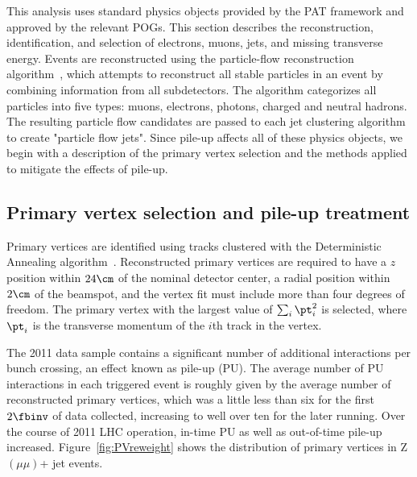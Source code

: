 This analysis uses standard physics objects provided by the PAT framework 
and approved by the relevant POGs.  This section describes the reconstruction,
identification, and selection of electrons, muons, jets, and
missing transverse energy. 
Events are reconstructed using the particle-flow reconstruction algorithm~\cite{particleflow},
which attempts to reconstruct all stable particles in an event by combining information from
all subdetectors. The algorithm categorizes all particles into five types: muons,
electrons, photons, charged and neutral hadrons. The resulting particle flow candidates are passed
to each jet clustering algorithm to create "particle flow jets".
 Since pile-up affects all of these physics objects,
we begin with a description of the primary vertex selection and the methods 
applied to mitigate the effects of pile-up.

\subsection{Primary vertex selection and pile-up treatment}

Primary vertices are identified using tracks clustered with the Deterministic
Annealing algorithm~\cite{PVDA}.  Reconstructed primary vertices are required to
have a $z$ position within $24\cm$ of the nominal detector center, a radial
position within $2\cm$ of the beamspot, and the vertex fit must include more 
than four degrees of freedom.  The primary vertex with the largest value of
$\sum_i {\pt}_i^2$ is selected, where ${\pt}_i$ is the transverse momentum of 
the $i$th track in the vertex.

The 2011 data sample contains a significant number of additional interactions 
per bunch crossing, an effect known as pile-up (PU).  The average number
of PU interactions in each triggered event is roughly given by the average number 
of reconstructed primary vertices, which was a little less than six for the first 
$2\fbinv$ of data collected, increasing to well over ten for the later running.  
Over the course of 2011 LHC operation, in-time PU as well as out-of-time pile-up
increased.  Figure~\ref{fig:PVreweight} shows the distribution of primary vertices
in Z$(\mu\mu)$+ jet  events.

